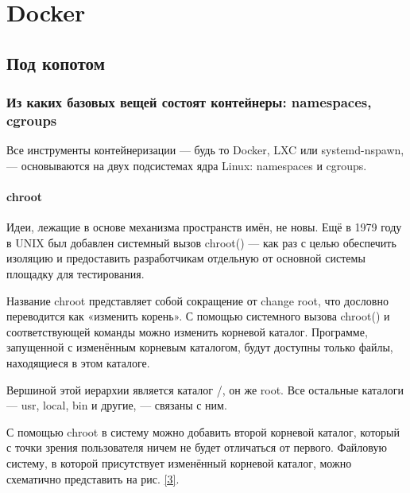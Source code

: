 \part{Docker}

\chapter{Под копотом}

\section{Из каких базовых вещей состоят контейнеры: namespaces, cgroups}
Все инструменты контейнеризации — будь то Docker, LXC или systemd-nspawn,— основываются на двух подсистемах ядра Linux: namespaces и cgroups. 

\subsection{chroot}

Идеи, лежащие в основе механизма пространств имён, не новы. Ещё в 1979 году в UNIX был добавлен системный вызов chroot() — как раз с целью обеспечить изоляцию и предоставить разработчикам отдельную от основной системы площадку для тестирования. 

Название chroot представляет собой сокращение от change root, что дословно переводится как «изменить корень». С помощью системного вызова chroot() и соответствующей команды можно изменить корневой каталог. Программе, запущенной с изменённым корневым каталогом, будут доступны только файлы, находящиеся в этом каталоге. 

Вершиной этой иерархии является каталог /, он же root. Все остальные каталоги — usr, local, bin и другие, — связаны с ним.

С помощью chroot в систему можно добавить второй корневой каталог, который с точки зрения пользователя ничем не будет отличаться от первого. Файловую систему, в которой присутствует изменённый корневой каталог, можно схематично представить на рис. \ref{3}.

